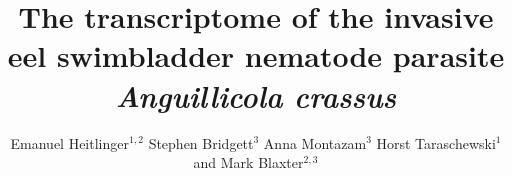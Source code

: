 \documentclass[10pt]{bmc_article}
\newenvironment{bmcformat}{\begin{raggedright}\baselineskip20pt\sloppy\setboolean{publ}{false}}{\end{raggedright}\baselineskip20pt\sloppy}
\begin{document}
\begin{bmcformat}


  \title{The transcriptome of the invasive eel swimbladder nematode
    parasite \textit{Anguillicola crassus}}
 


\author{Emanuel Heitlinger\correspondingauthor$^{1,2}$%
       Stephen Bridgett$^{3}$%
       Anna Montazam$^{3}$%
       Horst Taraschewski$^1$%
       and Mark Blaxter$^{2,3}$%
     }%
      


      \address{%
        \iid(1)Department of Ecology and Parasitology, Zoological
        Institute 1, University of Karlsruhe,%
        Kornblumenstrasse 13, Karlsruhe, Germany\\
        \iid(2)Institute of Evolutionary Biology, The Ashworth Laboratories, The University of Edinburgh, The King's Buildings, Edinburgh EH9 3JT, UK
        \iid(3)The GenePool Genomics Facility, The Ashworth Laboratories, The University of Edinburgh, The King's Buildings, Edinburgh EH9 3JT, UK
      }%

\maketitle


\end{bmcformat}
\end{document}
